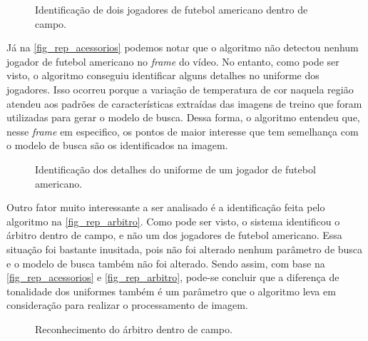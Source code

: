 \begin{figure}[ht]
	\caption{\label{fig_rep_dois_jogadores}Identificação de dois jogadores de futebol americano dentro de campo.}
	\begin{center}
	\end{center}
	\centering {}
\end{figure}

Já na \autoref{fig_rep_acessorios} podemos notar que o algoritmo não detectou nenhum jogador de futebol americano no \textit{frame} do vídeo. No entanto, como pode ser visto, o algoritmo conseguiu identificar alguns detalhes no uniforme dos jogadores. Isso ocorreu porque a variação de temperatura de cor naquela região atendeu aos padrões de características extraídas das imagens de treino que foram utilizadas para gerar o modelo de busca. Dessa forma, o algoritmo entendeu que, nesse \textit{frame} em especifico, os pontos de maior interesse que tem semelhança com o modelo de busca são os identificados na imagem.

\begin{figure}[ht]
	\caption{\label{fig_rep_acessorios}Identificação dos detalhes do uniforme de um jogador de futebol americano.}
	\begin{center}
	\end{center}
	\centering {}
\end{figure}

Outro fator muito interessante a ser analisado é a identificação feita pelo algoritmo na \autoref{fig_rep_arbitro}. Como pode ser visto, o sistema identificou o árbitro dentro de campo, e não  um dos jogadores de futebol americano. Essa situação foi bastante inusitada, pois não foi alterado nenhum parâmetro de busca e o modelo de busca também não foi alterado. Sendo assim, com base na \autoref{fig_rep_acessorios} e \autoref{fig_rep_arbitro}, pode-se concluir que a diferença de tonalidade dos uniformes também é um parâmetro que o algoritmo leva em consideração para realizar o processamento de imagem.

\clearpage

\begin{figure}[ht]
	\caption{\label{fig_rep_arbitro}Reconhecimento do árbitro dentro de campo.}
	\begin{center}
	\end{center}
	\centering {}
\end{figure}

